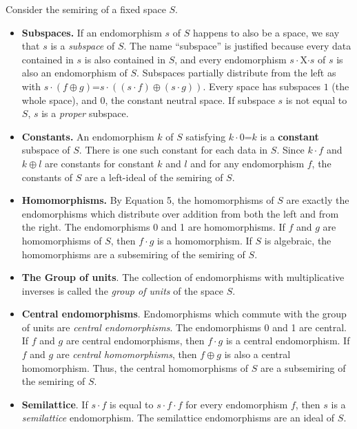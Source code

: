 \documentclass[11pt]{article}
\begin{document}
Consider the semiring of a fixed space $S$.  
\begin{itemize}

\item{{\bf Subspaces.} If an endomorphism $s$ of $S$ happens to also be a space, we say that $s$ is a {\it subspace} of $S$.  The name ``subspace'' is justified because every data contained in $s$ is also contained in $S$, and every endomorphism $s\cdot$X$\cdot s$ of $s$ is also an endomorphism of $S$.  
Subspaces partially distribute from the left as with $s\cdot(f\oplus g)$=$s\cdot((s\cdot f)\oplus(s\cdot g))$.
Every space has subspaces $1$ (the whole space), and $0$, the constant neutral space.  If subspace $s$ is not equal to $S$, $s$ is a {\it proper} subspace.} 

\item{{\bf Constants.}  An endomorphism $k$ of $S$ satisfying $k\cdot 0$=$k$ is a {\bf constant} subspace of $S$.  There is one such constant for each 
data in $S$.  Since $k\cdot f$ and $k\oplus l$ are constants for 
constant $k$ and $l$ and for any endomorphism $f$, the constants of $S$ are a left-ideal of the semiring of $S$.} 

\item{{\bf Homomorphisms.}  By Equation 5, the homomorphisms of $S$ are exactly the endomorphisms which distribute over addition from
both the left and from the right.  The endomorphisms 0 and 1 are homomorphisms.  If $f$ and $g$ are homomorphisms of $S$, then 
$f\cdot g$ is a homomorphism.  If $S$ is algebraic, the homomorphisms are a subsemiring of the semiring of $S$.} 

\item {{\bf The Group of units}. The collection of endomorphisms with multiplicative inverses is called the {\it group of units} of the space $S$.} 

\item{{\bf Central endomorphisms}.  Endomorphisms which commute with the group of units are {\it central endomorphisms}.  The endomorphisms 0 and 1 
are central.  If $f$ and $g$ are central endomorphisms, then $f\cdot g$ is a central endomorphism.  If $f$ and $g$ are {\it central homomorphisms}, then 
$f\oplus g$ is also a central homomorphism.  Thus, the central homomorphisms of $S$ are a subsemiring of the semiring of $S$.}

\item{{\bf Semilattice}.  If $s\cdot f$ is equal to $s\cdot f\cdot f$ for every endomorphism $f$, then $s$ is a {\it semilattice} endomorphism.  The 
semilattice endomorphisms are an ideal of $S$.} 


\end{itemize}
\end{document}
